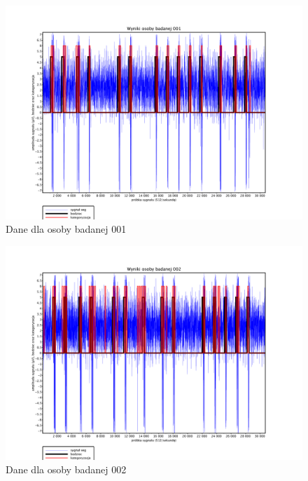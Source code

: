 \documentclass{article}
\begin{document}
        \begin{figure}
            \hspace*{-4.5cm} 
            \vspace*{1.5cm} 
            \includegraphics[width=\linewidth+10cm]{../plotting_data/scilab_eeg_01_sub_001.pdf}
            \caption{Dane dla osoby badanej 001}
        \end{figure}
        \begin{figure}
            \hspace*{-4.5cm} 
            \vspace*{1.5cm} 
            \includegraphics[width=\linewidth+10cm]{../plotting_data/scilab_eeg_01_sub_002.pdf}
            \caption{Dane dla osoby badanej 002}
        \end{figure}
\end{document}
